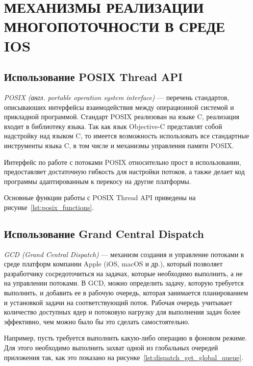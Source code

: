 \section[Механизмы реализации многопоточности в среде iOS]
{МЕХАНИЗМЫ РЕАЛИЗАЦИИ \\ МНОГОПОТОЧНОСТИ В СРЕДЕ IOS}

\subsection{Использование POSIX Thread API}

\textit{POSIX (англ. portable operation system interface)} --- перечень стандартов,
описываюших интерфейсы взаимодействия между операционной системой и прикладной
программой. Стандарт POSIX реализован на языке C, реализация входит в библиотеку языка.
Так как язык Objective-C представлят собой
надстройку над языком C, то имеется возможность использовать все стандартные
инструменты языка C, в том числе и механизмы управления памяти POSIX.

Интерфейс по работе с потоками POSIX относительно прост в использовании, предоставляет
достаточную гибкость для настройки потоков, а также делает код программы
адаптированным к перекосу на другие платформы.

Основные функции работы с POSIX Thread API приведены на рисунке~\ref{lst:posix_functions}.




\subsection{Использование Grand Central Dispatch}

\textit{GCD (Grand Central Dispatch)} --- механизм создания и управление потоками
в среде платформ компании Apple (iOS, macOS и др.), который позволяет разработчику
сосредоточиться на задачах, которые необходимо выполнить, а не на управлении потоками.
В GCD, можно определить задачу, которую требуется выполнить, и добавить ее в
рабочую очередь, которая занимается планированием и установкой задачи
на соответствующий поток.
Рабочая очередь учитывает количество доступных ядер и потоковую нагрузку для
выполнения задач более эффективно, чем можно было бы это сделать самостоятельно.

Например, пусть требуется выполнить какую-либо операцию в фоновом режиме. Для
этого необходимо выполнить захват одной из глобальных очередей приложения так,
как это показано на рисунке~\ref{lst:dispatch_get_global_queue}.


